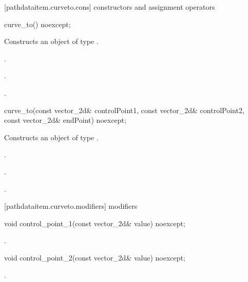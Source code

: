  [pathdataitem.curveto.cons] { constructors and assignment operators}

\begin{itemdecl}
    curve_to() noexcept;
\end{itemdecl}
\begin{itemdescr}
	\pnum
	\effects
	Constructs an object of type .
	
	\pnum
	\postconditions
	.

	.

	.
\end{itemdescr}

\begin{itemdecl}
    curve_to(const vector_2d& controlPoint1, const vector_2d& controlPoint2,
      const vector_2d& endPoint) noexcept;
\end{itemdecl}
\begin{itemdescr}
	\pnum
	\effects
	Constructs an object of type .
	
	\pnum
	\postconditions
	.

	.

	.
\end{itemdescr}

 [pathdataitem.curveto.modifiers]{ modifiers}

\begin{itemdecl}
    void control_point_1(const vector_2d& value) noexcept;
\end{itemdecl}
\begin{itemdescr}
	\pnum
	\postconditions
	.
\end{itemdescr}

\begin{itemdecl}
    void control_point_2(const vector_2d& value) noexcept;
\end{itemdecl}
\begin{itemdescr}
	\pnum
	\postconditions
	.
\end{itemdescr}

